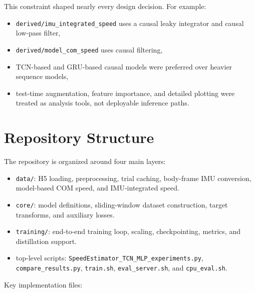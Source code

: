 \documentclass[11pt,a4paper]{article}
\begin{document}
This constraint shaped nearly every design decision. For example:

\begin{itemize}
\item \texttt{derived/imu\_integrated\_speed} uses a causal leaky integrator and causal low-pass filter,
\item \texttt{derived/model\_com\_speed} uses causal filtering,
\item TCN-based and GRU-based causal models were preferred over heavier sequence models,
\item test-time augmentation, feature importance, and detailed plotting were treated as analysis tools, not deployable inference paths.
\end{itemize}

\section{Repository Structure}

The repository is organized around four main layers:

\begin{itemize}
\item \texttt{data/}: H5 loading, preprocessing, trial caching, body-frame IMU conversion, model-based COM speed, and IMU-integrated speed.
\item \texttt{core/}: model definitions, sliding-window dataset construction, target transforms, and auxiliary losses.
\item \texttt{training/}: end-to-end training loop, scaling, checkpointing, metrics, and distillation support.
\item top-level scripts: \texttt{SpeedEstimator\_TCN\_MLP\_experiments.py}, \texttt{compare\_results.py}, \texttt{train.sh}, \texttt{eval\_server.sh}, and \texttt{cpu\_eval.sh}.
\end{itemize}

Key implementation files:
\end{document}

